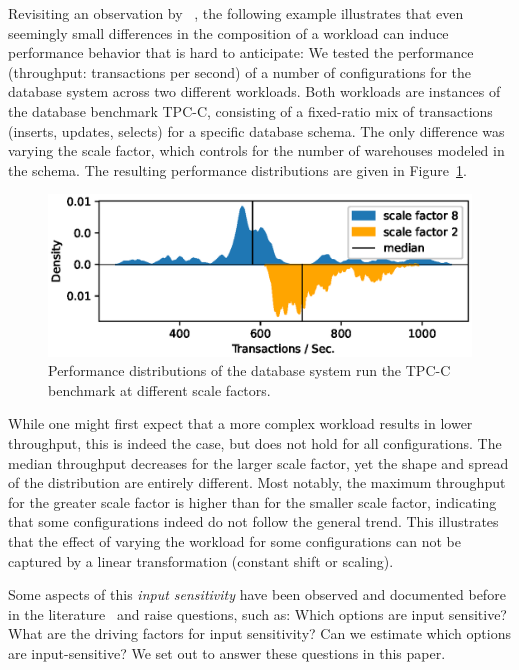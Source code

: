 Revisiting an observation by \citeauthor{alves_sampling_2020}~\cite{alves_sampling_2020}, the following example illustrates that even seemingly small differences in the composition of a workload can induce performance behavior that is hard to anticipate: We tested the performance (throughput: transactions per second) of a number of configurations for the database system \htwo across two different workloads. Both workloads are instances of the database benchmark \textsf{TPC-C}, consisting of a fixed-ratio mix of transactions (inserts, updates, selects) for a specific database schema. The only difference was varying the scale factor, which controls for the number of warehouses modeled in the schema. The resulting performance distributions are given in Figure~\ref{fig:h2_intro}.
\begin{figure}
	\centering
	\includegraphics[width=0.8\linewidth]{images/h2_motivation.eps}
	\caption{Performance distributions of the database system \htwo run the \textsf{TPC-C} benchmark at different scale factors.}
	\label{fig:h2_intro}
\end{figure}
While one might first expect that a more complex workload results in lower throughput, this is indeed the case, but does not hold for all configurations. The median throughput decreases for the larger scale factor, yet the shape and spread of the distribution are entirely different. Most notably, the maximum throughput for the greater scale factor is higher than for the smaller scale factor, indicating that some configurations indeed do not follow the general trend. This illustrates that the effect of varying the workload for some configurations can not be captured by a linear transformation (constant shift or scaling).


Some aspects of this \emph{input sensitivity} have been observed and documented before in the literature~\cite{liao_2020_using_emse,alves_sampling_2020,jamishidi_transfer_2017} and raise questions, such as: Which options are input sensitive? What are the driving factors for input sensitivity? Can we estimate which options are input-sensitive? We set out to answer these questions in this paper.

